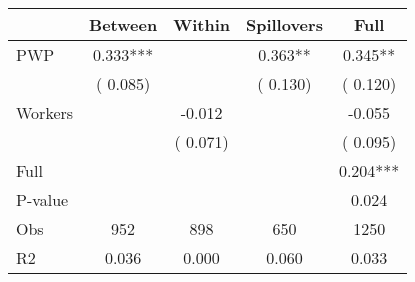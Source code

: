 
\begin{tabular}{l*{4}{c}}\hline&\multicolumn{1}{c}{Between}&\multicolumn{1}{c}{Within}&\multicolumn{1}{c}{Spillovers}&\multicolumn{1}{c}{Full}\\ \hline
 PWP           &              0.333***      &                                               &        0.363** &         0.345**                            \\ 
                               &        (       0.085)           &                                       &       (       0.130)     &      (       0.120)                                           \\ 
 Workers       &                                               &       -0.012    &                                &            -0.055                            \\ 
                               &                                               & (       0.071)                  &                                        &      (       0.095)                                           \\ 
\hline                                                                                                                                                                                                                                            
 Full                  &                                               &                                               &                                        &             0.204***                                     \\ 
 P-value               &                                               &                                               &                                        &             0.024                                           \\ 
 Obs                   &               952               &       898                       &       650                &              1250                                               \\ 
 R2                    &                      0.036              &              0.000                      &              0.060               &                     0.033                                              \\ 
\hline \end{tabular}                                                                                                                                                                                                              